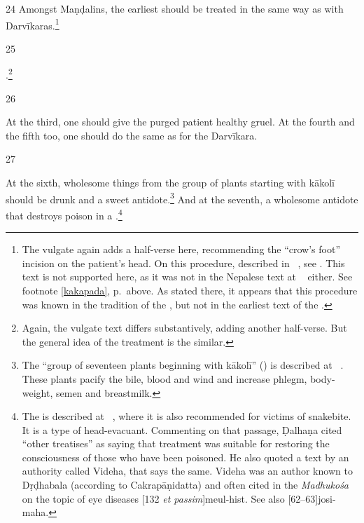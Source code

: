 \begin{translation}
\item [24] Amongst Maṇḍalins, the earliest 
should be treated in the same way as with
Darvīkaras.\footnote{\label{crowsfoot}The vulgate again adds a half-verse
    here, recommending the “crow's foot” incision on the patient's head. On
    this procedure, described in  \CS\ , see
    \cite[145]{wuja-2003}. This text is not supported here, as it was not in
    the Nepalese text at \SS\  either. See footnote
    \ref{kakapada}, p.\,\pageref{kakapada} above.  As stated there, it
    appears that this procedure was known in the tradition of the \CS, but
    not in the earliest text of the \SS.}
    
\item [25]

.\footnote{Again, the vulgate text differs substantively, adding 
another half-verse.  But the general idea of the treatment is the 
similar.}

\item [26]

At the third, one should give the purged patient healthy gruel. At the fourth and 
the fifth too, one should do the same as for the Darvīkara.

\item [27]

At the sixth, wholesome things from the group of plants starting with
\gls{kākolī} should be drunk and a sweet antidote.\footnote{The “group of
    seventeen plants beginning with \gls{kākolī}” () is
    described at \SS\ . These plants pacify the bile,
    blood and wind and increase phlegm, body-weight, semen and breastmilk.}
    And at the seventh, a wholesome antidote that destroys poison in a
    .\footnote{The  is described at
        \SS\ , where it is also recommended for victims of
        snakebite.  It is a type of head-evacuant. Commenting on that passage,
        Ḍalhaṇa cited “other treatises” as saying that  treatment
        was suitable for restoring the consciousness of those who have been
        poisoned.  He also quoted a text by an authority called Videha, that says
        the same.  Videha was an author known to Dṛḍhabala (according to
        Cakrapāṇidatta) and often cited in the \emph{Madhukośa} on the topic of
        eye diseases [132 \emph{et passim}]{meul-hist}. See also
        [62--63]{josi-maha}.}


\end{translation}
